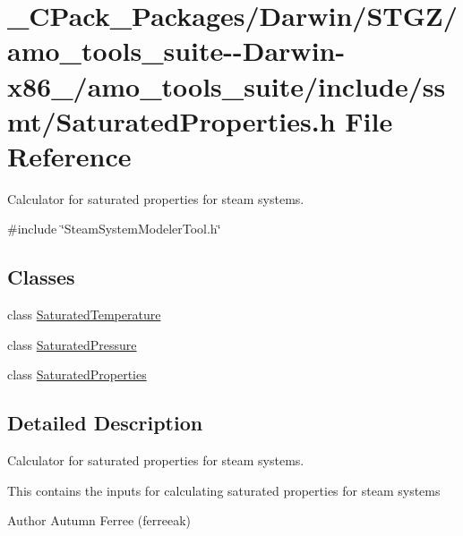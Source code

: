 \hypertarget{___c_pack___packages_2_darwin_2_s_t_g_z_2amo__tools__suite--_darwin-x86__64_2amo__tools__suite_2b97ccf799ea6561aa4d6a618c8073459}{}\section{\+\_\+\+C\+Pack\+\_\+\+Packages/\+Darwin/\+S\+T\+G\+Z/amo\+\_\+tools\+\_\+suite-\/-\/\+Darwin-\/x86\+\_/amo\+\_\+tools\+\_\+suite/include/ssmt/\+Saturated\+Properties.h File Reference}
\label{___c_pack___packages_2_darwin_2_s_t_g_z_2amo__tools__suite--_darwin-x86__64_2amo__tools__suite_2b97ccf799ea6561aa4d6a618c8073459}


Calculator for saturated properties for steam systems.  


{\ttfamily \#include \char`\"{}Steam\+System\+Modeler\+Tool.\+h\char`\"{}}\newline
\subsection*{Classes}
\begin{DoxyCompactItemize}
\item 
class \hyperlink{class_saturated_temperature}{Saturated\+Temperature}
\item 
class \hyperlink{class_saturated_pressure}{Saturated\+Pressure}
\item 
class \hyperlink{class_saturated_properties}{Saturated\+Properties}
\end{DoxyCompactItemize}


\subsection{Detailed Description}
Calculator for saturated properties for steam systems. 

This contains the inputs for calculating saturated properties for steam systems

\begin{DoxyAuthor}{Author}
Autumn Ferree (ferreeak) 
\end{DoxyAuthor}
